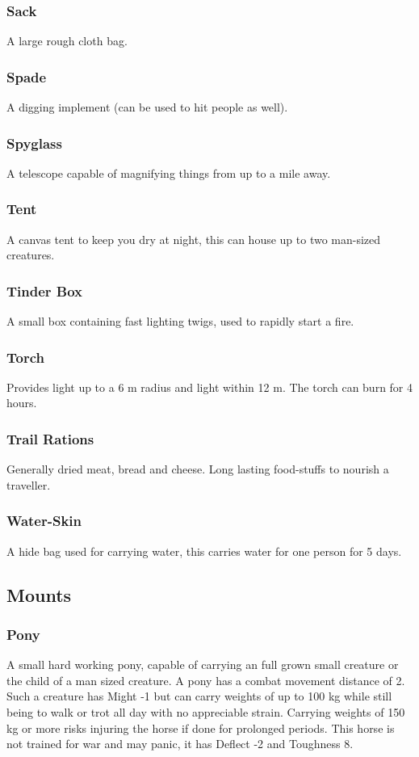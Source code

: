 \subsubsection*{Sack}
A large rough cloth bag.

\subsubsection*{Spade}
A digging implement (can be used to hit people as well).

\subsubsection*{Spyglass}
A telescope capable of magnifying things from up to a mile away.

\subsubsection*{Tent}
A canvas tent to keep you dry at night, this can house up to two man-sized creatures.

\subsubsection*{Tinder Box}
A small box containing fast lighting twigs, used to rapidly start a fire.

\subsubsection*{Torch}
Provides  light up to a 6 m radius and  light within 12 m. The torch can burn for 4 hours.

\subsubsection*{Trail Rations}
Generally dried meat, bread and cheese. Long lasting food-stuffs to nourish a traveller.

\subsubsection*{Water-Skin}
A hide bag used for carrying water, this carries water for one person for 5 days.

\subsection{Mounts}
\subsubsection*{Pony}
A small hard working pony, capable of carrying an full grown small creature or the child of a man sized creature. A pony has a combat movement distance of 2. Such a creature has Might -1 but can carry weights of up to 100 kg while still being to walk or trot all day with no appreciable strain. Carrying weights of 150 kg or more risks injuring the horse if done for prolonged periods. This horse is not trained for war and may panic, it has Deflect -2 and Toughness 8.

